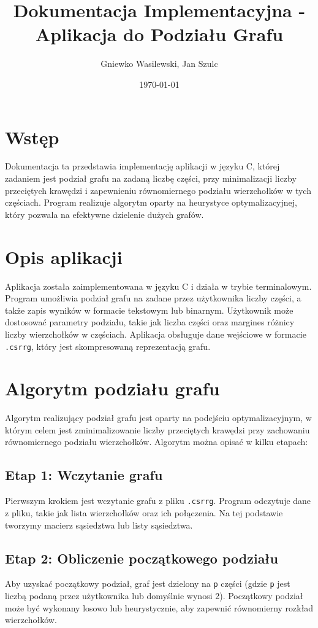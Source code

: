 \documentclass[a4paper,12pt]{article}
\title{Dokumentacja Implementacyjna - Aplikacja do Podziału Grafu}
\author{Gniewko Wasilewski, Jan Szulc}
\date{\today}
\begin{document}
\maketitle

\section{Wstęp}
Dokumentacja ta przedstawia implementację aplikacji w języku C, której zadaniem jest podział grafu na zadaną liczbę części, przy minimalizacji liczby przeciętych krawędzi i zapewnieniu równomiernego podziału wierzchołków w tych częściach. Program realizuje algorytm oparty na heurystyce optymalizacyjnej, który pozwala na efektywne dzielenie dużych grafów.

\section{Opis aplikacji}

Aplikacja została zaimplementowana w języku C i działa w trybie terminalowym. Program umożliwia podział grafu na zadane przez użytkownika liczby części, a także zapis wyników w formacie tekstowym lub binarnym. Użytkownik może dostosować parametry podziału, takie jak liczba części oraz margines różnicy liczby wierzchołków w częściach. Aplikacja obsługuje dane wejściowe w formacie \texttt{.csrrg}, który jest skompresowaną reprezentacją grafu.

\section{Algorytm podziału grafu}

Algorytm realizujący podział grafu jest oparty na podejściu optymalizacyjnym, w którym celem jest zminimalizowanie liczby przeciętych krawędzi przy zachowaniu równomiernego podziału wierzchołków. Algorytm można opisać w kilku etapach:

\subsection{Etap 1: Wczytanie grafu}
Pierwszym krokiem jest wczytanie grafu z pliku \texttt{.csrrg}. Program odczytuje dane z pliku, takie jak lista wierzchołków oraz ich połączenia. Na tej podstawie tworzymy macierz sąsiedztwa lub listy sąsiedztwa.

\subsection{Etap 2: Obliczenie początkowego podziału}
Aby uzyskać początkowy podział, graf jest dzielony na \texttt{p} części (gdzie \texttt{p} jest liczbą podaną przez użytkownika lub domyślnie wynosi 2). Początkowy podział może być wykonany losowo lub heurystycznie, aby zapewnić równomierny rozkład wierzchołków.
\end{document}
